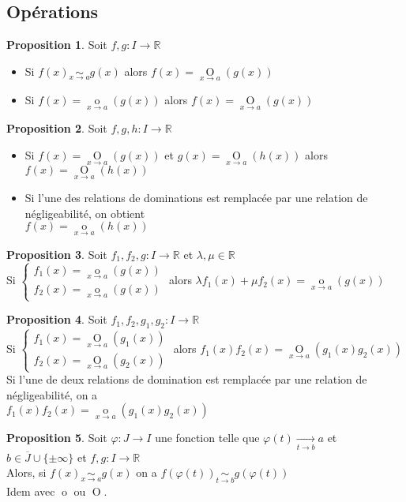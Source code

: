 \documentclass[10pt,a4paper]{article}
\theoremstyle{definition}
\newtheorem{proposition}{Proposition}[section]
\DeclareMathOperator*{\eqv}{\sim}
\DeclareMathOperator*{\negl}{o}
\DeclareMathOperator*{\dom}{O}
\begin{document}
\subsection{Opérations}
\begin{proposition}
Soit $f,g: I \to \mathbb{R}$
\begin{itemize}
\item Si $f(x) \eqv\limits_{x \to a} g(x)$ alors $f(x) = \dom\limits_{x \to a}(g(x))$
\item Si $f(x) = \negl\limits_{x \to a}(g(x))$ alors $f(x) = \dom\limits_{x \to a}(g(x))$
\end{itemize}
\end{proposition}
\begin{proposition}
Soit $f,g,h: I \to \mathbb{R}$
\begin{itemize}
\item Si $f(x) = \dom\limits_{x \to a}(g(x))$ et $g(x) = \dom\limits_{x \to a}(h(x))$ alors $f(x) = \dom\limits_{x \to a}(h(x))$
\item Si l'une des relations de dominations est remplacée par une relation de négligeabilité, on obtient \\
$f(x) = \negl\limits_{x \to a}(h(x))$
\end{itemize}
\end{proposition}
\begin{proposition}
Soit $f_1, f_2, g: I \to \mathbb{R}$ et $\lambda, \mu \in \mathbb{R}$ \\
Si $\begin{cases}
f_1(x) = \negl\limits_{x \to a}(g(x)) \\
f_2(x) = \negl\limits_{x \to a}(g(x))
\end{cases}$ alors $\lambda f_1(x) + \mu f_2(x) = \negl\limits_{x \to a}(g(x))$
\end{proposition}
\begin{proposition}
Soit $f_1, f_2, g_1, g_2: I \to \mathbb{R}$ \\
Si $\begin{cases}
f_1(x) = \dom\limits_{x \to a}(g_1(x)) \\
f_2(x) = \dom\limits_{x \to a}(g_2(x))
\end{cases}$ alors $f_1(x) f_2(x) = \dom\limits_{x \to a}(g_1(x) g_2(x))$ \\
Si l'une de deux relations de domination est remplacée par une relation de négligeabilité, on a \\
$f_1(x) f_2(x) = \negl\limits_{x \to a}(g_1(x) g_2(x))$
\end{proposition}
\begin{proposition}
Soit $\varphi: J \to I$ une fonction telle que $\varphi(t) \xrightarrow[t \to b]{} a$ et $b \in \overline{J} \cup \{ \pm\infty \}$ et $f, g: I \to \mathbb{R}$ \\
Alors, si $f(x) \eqv\limits_{x \to a} g(x)$ on a $f(\varphi(t)) \eqv\limits_{t \to b} g(\varphi(t))$ \\
Idem avec $\negl$ ou $\dom$.
\end{proposition}
\end{document}
